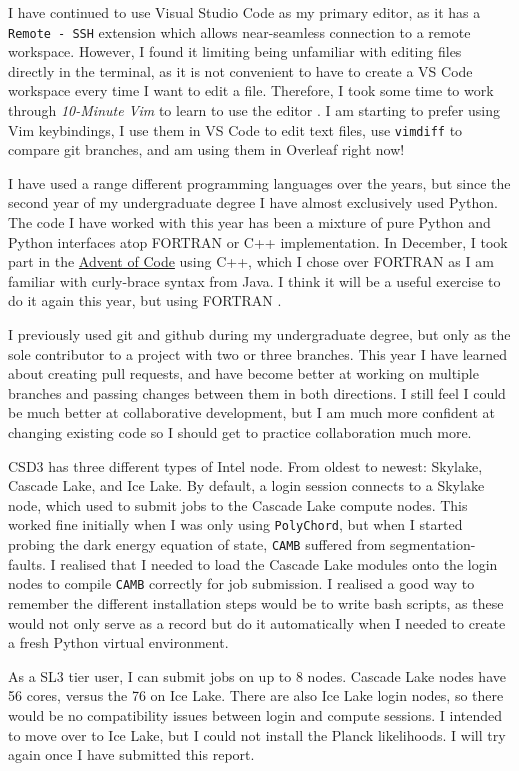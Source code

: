 \documentclass{article}
\begin{document}
I have continued to use Visual Studio Code as my primary editor, as it has a \texttt{Remote - SSH} extension which allows near-seamless connection to a remote workspace. However, I found it limiting being unfamiliar with editing files directly in the terminal, as it is not convenient to have to create a VS Code workspace every time I want to edit a file. Therefore, I took some time to work through \textit{10-Minute Vim} to learn to use the editor \cite{vim}. I am starting to prefer using Vim keybindings, I use them in VS Code to edit text files, use \texttt{vimdiff} to compare git branches, and am using them in Overleaf right now!

I have used a range different programming languages over the years, but since the second year of my undergraduate degree I have almost exclusively used Python. The code I have worked with this year has been a mixture of pure Python and Python interfaces atop FORTRAN or C++ implementation. In December, I took part in the \href{https://adventofcode.com}{Advent of Code} using C++, which I chose over FORTRAN as I am familiar with curly-brace syntax from Java. I think it will be a useful exercise to do it again this year, but using FORTRAN \cite{advent}. 

I previously used git and github during my undergraduate degree, but only as the sole contributor to a project with two or three branches. This year I have learned about creating pull requests, and have become better at working on multiple branches and passing changes between them in both directions. I still feel I could be much better at collaborative development, but I am much more confident at changing existing code so I should get to practice collaboration much more.

CSD3 has three different types of Intel node. From oldest to newest: Skylake, Cascade Lake,  and Ice Lake. By default, a login session connects to a Skylake node, which used to submit jobs to the Cascade Lake compute nodes. This worked fine initially when I was only using \texttt{PolyChord}, but when I started probing the dark energy equation of state, \texttt{CAMB} suffered from segmentation-faults. I realised that I needed to load the Cascade Lake modules onto the login nodes to compile \texttt{CAMB} correctly for job submission. I realised a good way to remember the different installation steps would be to write bash scripts, as these would not only serve as a record but do it automatically when I needed to create a fresh Python virtual environment.

As a SL3 tier user, I can submit jobs on up to 8 nodes. Cascade Lake nodes have 56 cores, versus the 76 on Ice Lake. There are also Ice Lake login nodes, so there would be no compatibility issues between login and compute sessions. I intended to move over to Ice Lake, but I could not install the Planck likelihoods. I will try again once I have submitted this report.
\end{document}
